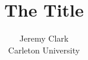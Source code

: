 \documentclass[letterpaper,twocolumn,10pt]{article}
\begin{document}
\date{}

\title{\Large \bf The Title}

\author{{\rm Jeremy Clark}\\Carleton University}

\maketitle










\balance
{\footnotesize 
}
\nocite{*}


\clearpage
\appendix
\end{document}
